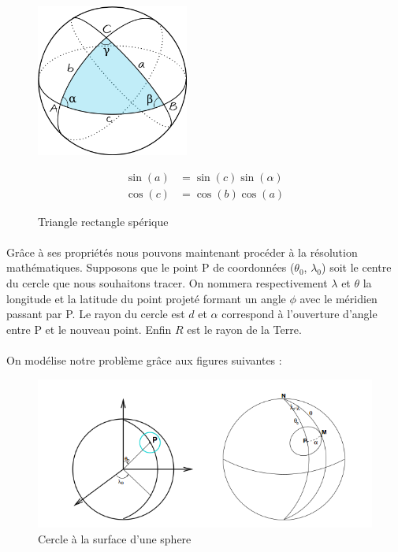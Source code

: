\documentclass[a4paper]{report}
\begin{document}
\begin{figure}[H]
	\begin{minipage}[c]{.46\linewidth}
		\begin{center}
			\includegraphics[width=5cm]{image/sprint2_triangles_spheriques}
       			\caption{Triangle rectangle spérique}
			\label{Triangle rectangle spérique}
		\end{center}
	\end{minipage} \hfill
	\begin{minipage}[c]{.46\linewidth}
		\begin{align}
			\sin(a)&=\sin(c)\sin(\alpha) \\
			\cos(c)&=\cos(b)\cos(a) 
		\end{align}
	\end{minipage}
\end{figure}

\paragraph{} Grâce à ses propriétés nous pouvons maintenant procéder à la résolution mathématiques. Supposons que le point P de coordonnées ($\theta_{0}$, $\lambda_{0}$) soit le centre du cercle que nous souhaitons tracer. On nommera respectivement $\lambda$ et $\theta$ la longitude et la latitude du point projeté formant un angle $\phi$ avec le méridien passant par P. Le rayon du cercle est $d$ et $\alpha$ correspond à l'ouverture d'angle entre P et le nouveau point. Enfin $R$ est le rayon de la Terre.

\paragraph{} On modélise notre problème grâce aux figures suivantes :

\begin{figure}[H]
	\begin{center}
		\includegraphics[width=400pt]{image/sprint2_petits-cercles}
		\caption{Cercle à la surface d'une sphere}
		\label{Cercle à la surface d'une sphere}
	\end{center}
\end{figure}
\end{document}
